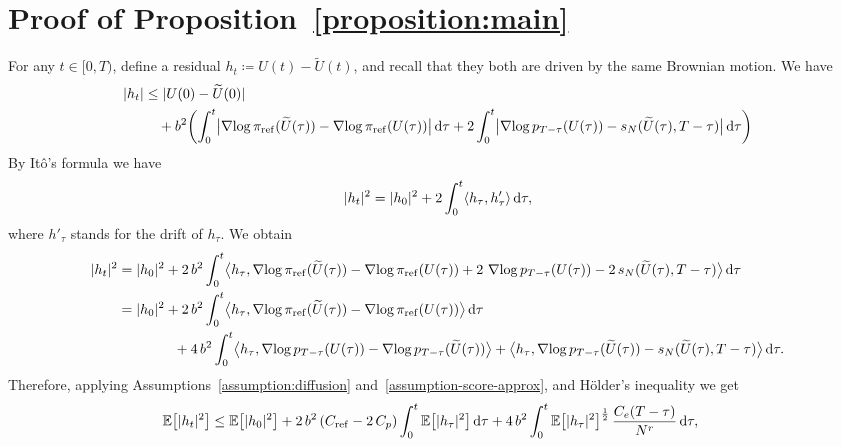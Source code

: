 \documentclass{article}
\begin{document}
\section{Proof of Proposition~\ref{proposition:main}}
\label{app:proof-main}
For any $t\in[0, T)$, define a residual $h_t \coloneqq U(t) - \widetilde{U}(t)$, and recall that they both are driven by the same Brownian motion. 
We have 
%
\begin{equation}
	\begin{split}
		\lvert h_t\rvert &\leq \lvert U(0) - \widetilde{U}(0)\rvert \\
		&\quad + b^2 \biggl( \int^t_0 \bigl \lvert  \operatorname{\nabla\!}\log \pi_{\mathrm{ref}}(\widetilde{U}(\tau)) - \operatorname{\nabla\!}\log\pi_{\mathrm{ref}}(U(\tau)) \bigr\rvert\mathop{}\!\mathrm{d} \tau + 2\int^t_0 \bigl \lvert  \operatorname{\nabla\!}\log p_{T - \tau}(U(\tau)) - s_N(\widetilde{U}(\tau), T - \tau) \bigr\rvert \mathop{}\!\mathrm{d} \tau \biggr) \\
	\end{split}
\end{equation}
%
By It\^{o}'s formula we have 
%
\begin{equation}
	\lvert h_t\rvert^2 = \lvert h_0\rvert^2 + 2 \int^t_0 \langle h_\tau, h'_\tau\rangle \mathop{}\!\mathrm{d} \tau,
\end{equation}
where $h'_\tau$ stands for the drift of $h_\tau$. 
We obtain
%
\begin{equation*}
	\begin{split}
		\abs{h_t}^2 &= \abs{h_0}^2 + 2 \, b^2 \int^t_0 \innerpbig{h_\tau, \grad\log \refmeasure(\widetilde{U}(\tau)) - \grad\log\refmeasure(U(\tau)) + 2 \, \grad\log p_{T - \tau}(U(\tau)) - 2 \, s_N(\widetilde{U}(\tau), T - \tau)} \diff \tau \\
		&= \abs{h_0}^2 + 2 \, b^2 \int^t_0 \innerpbig{h_\tau, \grad\log \refmeasure(\widetilde{U}(\tau)) - \grad\log\refmeasure(U(\tau))} \diff \tau \\
		&\qquad\qquad+ 4 \, b^2 \int^t_0 \innerpbig{h_\tau, \grad\log p_{T - \tau}(U(\tau)) - \grad\log p_{T - \tau}(\widetilde{U}(\tau))} + \innerpbig{h_\tau, \grad\log p_{T - \tau}(\widetilde{U}(\tau)) - s_N(\widetilde{U}(\tau), T - \tau)} \diff \tau.
	\end{split}
\end{equation*}
%
Therefore, applying Assumptions~\ref{assumption:diffusion} and~\ref{assumption-score-approx}, and H\"{o}lder's inequality we get
%
\begin{equation*}
	\begin{split}
		\operatorname{\mathbb{E}} \bigl[ \lvert h_t\rvert^2 \bigr] &\leq \operatorname{\mathbb{E}} \bigl[ \lvert h_0\rvert^2 \bigr] + 2\,b^2 \,(C_\mathrm{ref} - 2\, C_p)\int^t_0 \operatorname{\mathbb{E}} \bigl[ \lvert h_\tau\rvert^2 \bigr] \mathop{}\!\mathrm{d} \tau + 4 \, b^2 \int^t_0 \operatorname{\mathbb{E}} \bigl[ \lvert h_\tau\rvert^2 \bigr]^{\frac{1}{2}} \, \frac{C_e(T - \tau)}{N^r} \mathop{}\!\mathrm{d} \tau,
	\end{split}
\end{equation*}
\end{document}
